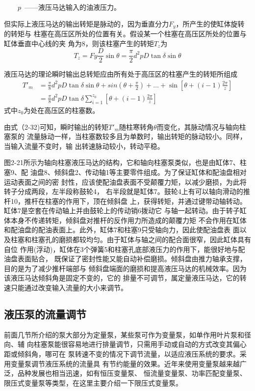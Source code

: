 \qquad \ \  \ \  $p$\ ——液压马达输入的油液压力。

但实际上液压马达的输出转矩是脉动的，因为垂直分力$F_{y}$，所产生的使缸体旋转的转矩与
柱塞在高压区所处的位置有关。假设某一个柱塞在高压区所处的位置与缸体垂直中心线的夹
角为8，则该柱塞产生的转矩$T_{z}$为
$$T_{z}=Fy\frac{D}{2}\sin\theta =\frac{\pi }{2} d^2pD\tan \delta \sin \theta  $$

液压马达的理论瞬时输出总转矩应由所有处于高压区的柱塞产生的转矩所组成
\begin{equation}
    \begin{split}
        T'_{m}&=\frac{\pi}{8}d^2pD\tan\delta {\sin\theta +
        sin(\theta +\frac{\pi}{2})+\dots+\sin[\theta +(i-1)\frac{2\pi}{z}]}\\
        &=\frac{\pi}{8}d^2pD\tan\delta \sum_{i = 1}^{z_{0}}  [ \theta +( i-1)\frac{2\pi}{z}]
    \end{split}
\end{equation}
式中$z_{0}$为处在高压区的柱塞数。

由式（2-32)可知，瞬时输出的转矩$T'_{m}$随柱寒转角$\theta $而变化，其脉动情况与轴向柱塞泵的
流量脉动一样，当柱塞数较多且为单数时，输出转矩的脉动较小。同样，当输入流量不变时，输
出转速脉动较小，转动平稳。

图2-21所示为轴向柱塞液压马达的结构，它和轴向柱塞泵类似，也是由缸体7、柱塞9、配
油盘8、倾斜盘2、传动轴1等主要零件组成。为了保证缸体和配油盘相对运动表面之间的密
封性，应该使配油盘表面不受颠覆力矩，以减少磨损，为此将转子分成两段，左半段称鼓轮4，
右半段就是缸体7。鼓轮4上有可以轴向滑动的推杆10，推杆在柱塞的作用下，顶在倾斜盘
上，获得转矩，并通过键带动轴转动。缸体7是空套在传动轴上并由鼓轮上的传动销6拨动它
与轴一起转动。由于转子缸体本身不传递转矩，倾斜盘对推杆的反作用力所造成的颠覆力矩
不会作用在缸体和配油盘的配油表面上。此外，缸体7和柱塞9只受轴向力，因此使配油盘表
面以及柱塞和柱塞孔的磨损都较均匀。由于缸体与轴之间的配合面很窄，因此缸体具有自位
作用(浮动)，缸体在3个弹簧5和柱塞孔底部液压力的作用下，能很好地与配油盘表面贴合，
既保证了密封性能又能自动补偿磨损。倾斜盘由推力轴承支撑，目的是为了减少推杆端部与
倾斜盘端面的磨损和提高液压马达的机械效率。因为该液压马达倾斜角是固定不变的，它的
排量不可调节，属定量液压马达，它的转速只能通过改变输入流量的大小来调节。

\subsection{液压泵的流量调节}

前面几节所介绍的泵大部分为定量泵，某些泵可作为变量泵，如单作用叶片泵和径向、辅
向柱塞泵能很容易地进行排量调节，只需用手动或自动的方式改变其偏心距或倾斜角，哪可在
泵转速不变的情况下调节流量，以适应液压系统的要求。采用变量泵调节液压系统的流量具
有节约能量的效果。近年来使用变量泵越来越广泛，品种发展也相当迅速，如有恒压变量泵、
恒流量变量泵、功率匹配变量泵、限压式变量泵等类型，在这里主要介绍一下限压式变量泵。